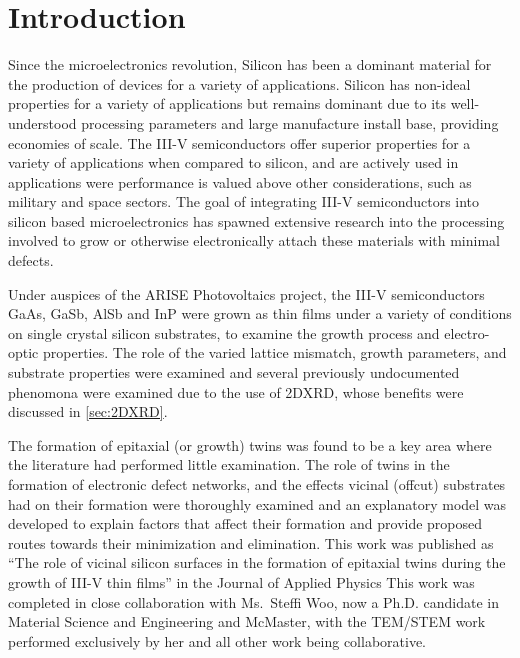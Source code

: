 \section{Introduction} \label{sec:twins}
Since the microelectronics revolution, Silicon has been a dominant material for the production of devices for a variety of applications.
Silicon has non-ideal properties for a variety of applications but remains dominant due to its well-understood processing parameters and large manufacture install base, providing economies of scale.
The III-V semiconductors offer superior properties for a variety of applications when compared to silicon, and are actively used in applications were performance is valued above other considerations, such as military and space sectors.
The goal of integrating III-V semiconductors into silicon based microelectronics has spawned extensive research into the processing involved to grow or otherwise electronically attach these materials with minimal defects.

Under auspices of the ARISE Photovoltaics project, the III-V semiconductors GaAs, GaSb, AlSb and InP were grown as thin films under a variety of conditions on single crystal silicon substrates, to examine the growth process and electro-optic properties.
The role of the varied lattice mismatch, growth parameters, and substrate properties were examined and several previously undocumented phenomona were examined due to the use of 2DXRD, whose benefits were discussed in \cref{sec:2DXRD}.

The formation of epitaxial (or growth) twins was found to be a key area where the literature had performed little examination.
The role of twins in the formation of electronic defect networks, and the effects vicinal (offcut) substrates had on their formation were thoroughly examined and an explanatory model was developed to explain factors that affect their formation and provide proposed routes towards their minimization and elimination.
This work was published as ``The role of vicinal silicon surfaces in the formation of epitaxial
twins during the growth of III-V thin films'' in the Journal of Applied Physics\cite{Devenyi2011}
This work was completed in close collaboration with Ms.~Steffi Woo, now a Ph.D. candidate in Material Science and Engineering and McMaster, with the TEM/STEM work performed exclusively by her and all other work being collaborative.
